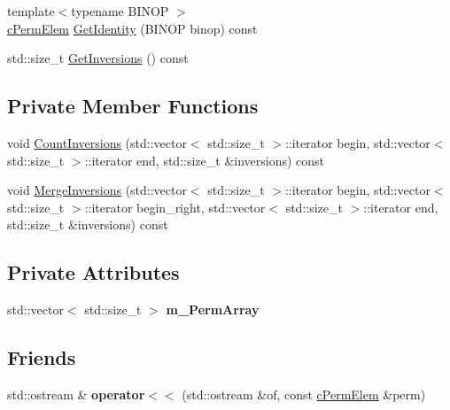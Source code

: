 \begin{DoxyCompactItemize}
\item 
{\footnotesize template$<$typename B\-I\-N\-O\-P $>$ }\\\hyperlink{classcPermElem}{c\-Perm\-Elem} \hyperlink{classcPermElem_a7f5392e3279b766d5f85c01d363c2941}{Get\-Identity} (B\-I\-N\-O\-P binop) const 
\item 
std\-::size\-\_\-t \hyperlink{classcPermElem_a06f75de000ad4b9524116a029800ca26}{Get\-Inversions} () const 
\end{DoxyCompactItemize}
\subsection*{Private Member Functions}
\begin{DoxyCompactItemize}
\item 
void \hyperlink{classcPermElem_abefedad75d8175a886b30a6d36a0eb98}{Count\-Inversions} (std\-::vector$<$ std\-::size\-\_\-t $>$\-::iterator begin, std\-::vector$<$ std\-::size\-\_\-t $>$\-::iterator end, std\-::size\-\_\-t \&inversions) const 
\item 
void \hyperlink{classcPermElem_aa39ae9f1b4d3efd38616ff822caebbb9}{Merge\-Inversions} (std\-::vector$<$ std\-::size\-\_\-t $>$\-::iterator begin, std\-::vector$<$ std\-::size\-\_\-t $>$\-::iterator begin\-\_\-right, std\-::vector$<$ std\-::size\-\_\-t $>$\-::iterator end, std\-::size\-\_\-t \&inversions) const 
\end{DoxyCompactItemize}
\subsection*{Private Attributes}
\begin{DoxyCompactItemize}
\item 
\hypertarget{classcPermElem_a9a8f181852cd76a706631b5283342c7f}{std\-::vector$<$ std\-::size\-\_\-t $>$ {\bfseries m\-\_\-\-Perm\-Array}}\label{classcPermElem_a9a8f181852cd76a706631b5283342c7f}

\end{DoxyCompactItemize}
\subsection*{Friends}
\begin{DoxyCompactItemize}
\item 
\hypertarget{classcPermElem_a4211aa547f8e3f2dc6b44ad07f7224db}{std\-::ostream \& {\bfseries operator$<$$<$} (std\-::ostream \&of, const \hyperlink{classcPermElem}{c\-Perm\-Elem} \&perm)}\label{classcPermElem_a4211aa547f8e3f2dc6b44ad07f7224db}

\end{DoxyCompactItemize}



